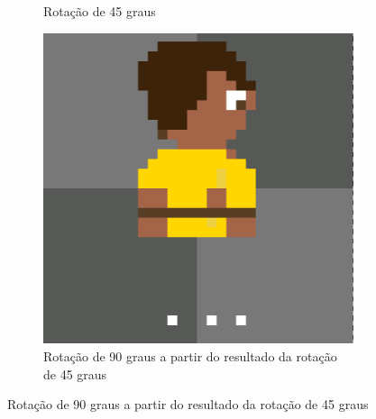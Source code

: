 \begin{figure}[htbp]
\begin{subfigure}{0.32\linewidth}
        \caption{\small Rotação de 45 graus}
        \label{fig:pixelLabRot4b}
    \end{subfigure}
    \begin{subfigure}{0.32\linewidth}
        \includegraphics[width=1\linewidth]{figs/pixelLab/dia2/rot90res4.PNG}
        \caption{\small Rotação de 90 graus a partir do resultado da rotação de 45 graus}
        \label{fig:pixelLabRot4c}
    \end{subfigure}
\end{figure}


